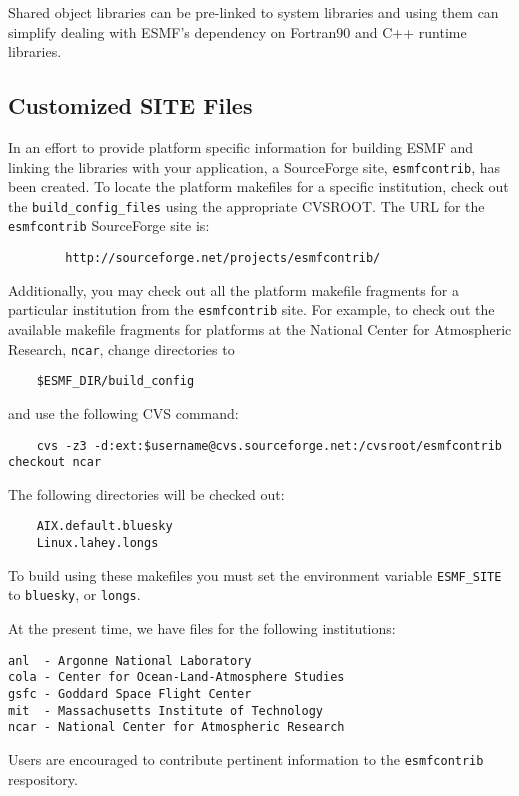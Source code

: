 Shared object libraries can be pre-linked to system libraries and using them
can simplify dealing with ESMF's dependency on Fortran90 and C++ runtime 
libraries. 

\subsection{Customized SITE Files}

In an effort to provide platform specific information for building ESMF 
and linking the libraries with your application, a SourceForge 
site, {\tt esmfcontrib}, has been created.
To locate the platform makefiles for a specific institution, check out 
the {\tt build\_config\_files} using the appropriate CVSROOT.
The URL for the {\tt esmfcontrib} SourceForge site is:

\begin{verbatim}
        http://sourceforge.net/projects/esmfcontrib/
\end{verbatim}

Additionally, you may check out all the platform makefile fragments 
for a particular institution from the {\tt esmfcontrib} site. For example, 
to check out the available makefile fragments for platforms at the
National Center for Atmospheric Research, {\tt ncar}, change directories to

\begin{verbatim}
 	$ESMF_DIR/build_config
\end{verbatim}

and use the following CVS command:

\begin{verbatim}
	cvs -z3 -d:ext:$username@cvs.sourceforge.net:/cvsroot/esmfcontrib checkout ncar
\end{verbatim}

The following directories will be checked out:

\begin{verbatim}
	AIX.default.bluesky
	Linux.lahey.longs
\end{verbatim}

To build using these makefiles you must set the environment 
variable {\tt ESMF\_SITE} to {\tt bluesky}, or {\tt longs}.

At the present time, we have files for the following institutions:

\begin{verbatim}
anl  - Argonne National Laboratory
cola - Center for Ocean-Land-Atmosphere Studies
gsfc - Goddard Space Flight Center
mit  - Massachusetts Institute of Technology
ncar - National Center for Atmospheric Research
\end{verbatim}


Users are encouraged to contribute pertinent information to the 
{\tt esmfcontrib} respository.





